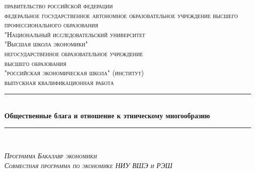\documentclass[12pt]{article}
\begin{document}
 \onehalfspacing
\begin{titlepage}

\newcommand{\HRule}{\rule{\linewidth}{0.5mm}} %

\center %

\textsc{правительство российской федерации}\\
\textsc{федеральное государственное автономное образовательное учреждение высшего профессионального образования}\\
\textsc{"Национальный исследовательский университет}\\
\textsc{"Высшая школа экономики"}\\[1cm] %

\textsc{негосударственное образовательное учреждение}\\
\textsc{высшего образования}\\
\textsc{"российская экономическая школа" (институт)}\\[2cm]

\textsc{\textmd{выпускная квалификационная работа}}\\[0.5cm]
\begin{spacing}{1.5}
\HRule \\[0.4cm]
{ \huge \bfseries Общественные блага и отношение к этническому многообразию}\\[0.4cm] %
\HRule \\[0.5cm]
\end{spacing}

\textsc{\textit{\large Программа Бакалавр экономики}}\\[0.2cm]
\textsc{\textit{\large Совместная программа по экономике НИУ ВШЭ и РЭШ}}\\[2cm]



\end{titlepage}
\end{document}
